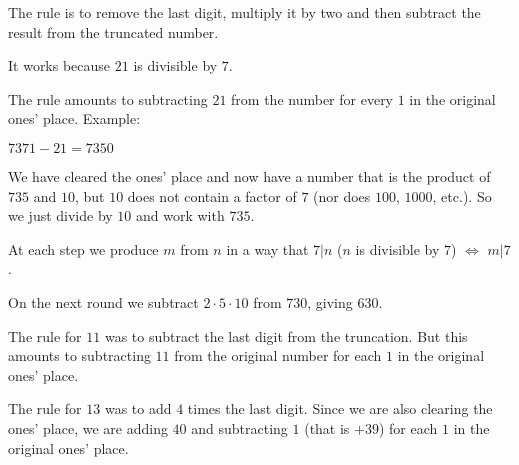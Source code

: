 \documentclass[11pt, oneside]{article}
\begin{document}
The rule is to remove the last digit, multiply it by two and then subtract the result from the truncated number.  

It works because $21$ is divisible by $7$.  

The rule amounts to subtracting $21$ from the number for every $1$ in the original ones' place.  Example:

$7371 - 21 = 7350$

We have cleared the ones' place and now have a number that is the product of $735$ and $10$, but $10$ does not contain a factor of $7$ (nor does $100$, $1000$, etc.).  So we just divide by $10$ and work with $735$.

At each step we produce $m$ from $n$ in a way that $7|n$ ($n$ is divisible by $7$) $\iff$ $m|7$.  

On the next round we subtract $2 \cdot 5 \cdot 10$ from $730$, giving $630$.

The rule for $11$ was to subtract the last digit from the truncation.  But this amounts to subtracting $11$ from the original number for each $1$ in the original ones' place.

The rule for $13$ was to add $4$ times the last digit.  Since we are also clearing the ones' place, we are adding $40$ and subtracting $1$ (that is $+ 39$) for each $1$ in the original ones' place.
\end{document}
